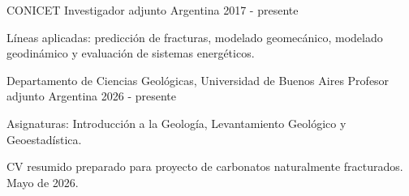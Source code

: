 \documentclass[10pt, a4paper]{awesome-cv}
\begin{document}
\vspace{-2mm}
\begin{cventries}
\cventry
  {CONICET}
  {Investigador adjunto}
  {Argentina}
  {2017 - presente}
  {
    \begin{cvitems}
      \item {Líneas aplicadas: predicción de fracturas, modelado geomecánico, modelado geodinámico y evaluación de sistemas energéticos.}
    \end{cvitems}
  }
\cventry
  {Departamento de Ciencias Geológicas, Universidad de Buenos Aires}
  {Profesor adjunto}
  {Argentina}
  {2026 - presente}
  {
    \begin{cvitems}
      \item {Asignaturas: Introducción a la Geología, Levantamiento Geológico y Geoestadística.}
    \end{cvitems}
  }
\end{cventries}

\vfill
\begin{center}
{\fontsize{7.8pt}{9pt}\bodyfontlight\color{graytext} CV resumido preparado para proyecto de carbonatos naturalmente fracturados. Mayo de 2026.}
\end{center}
\end{document}

